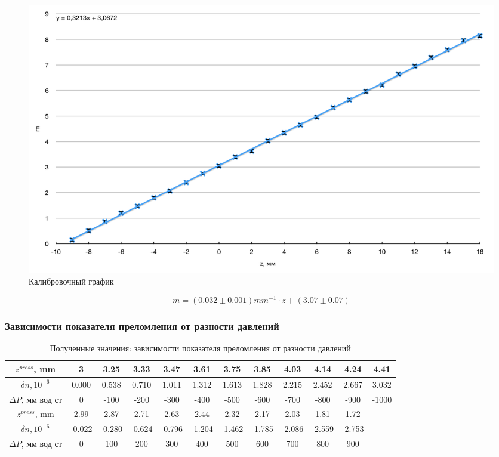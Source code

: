 \documentclass[a4paper, 12pt]{article}
\begin{document}
\begin{figure}[H]
	\centering
	\includegraphics[width = 16 cm]{2.png}
	\caption{Калибровочный график}
\end{figure}

\[m = (0.032\pm0.001)mm^{-1}\cdot z+(3.07\pm0.07)\]
\newpage

\subsubsection*{Зависимости показателя преломления от разности давлений}

\begin{table}[H]
	\centering
	\begin{tabular}{|c|c|c|c|c|c|c|c|c|c|c|c|}
		\hline	
		
	$z^{press}$, mm&3&3.25&3.33&3.47&3.61&3.75&3.85&4.03&4.14&4.24&4.41\\ \hline
	$\delta n, 10^{-6}$&0.000&0.538&0.710&1.011&1.312&1.613&1.828&2.215&2.452&2.667&3.032\\ \hline
	$\Delta P$, мм вод ст&0&-100&-200&-300&-400&-500&-600&-700&-800&-900&-1000\\ \hline
	$z^{press}$, mm&2.99&2.87&2.71&2.63&2.44&2.32&2.17&2.03&1.81&1.72&\\ \hline
	$\delta n, 10^{-6}$&-0.022&-0.280&-0.624&-0.796&-1.204&-1.462&-1.785&-2.086&-2.559&-2.753&\\ \hline
	$\Delta P$, мм вод ст&0&100&200&300&400&500&600&700&800&900&\\ \hline
		
	\end{tabular}	
	\caption{Полученные значения: зависимости показателя преломления от разности давлений}
\end{table}
\end{document}
